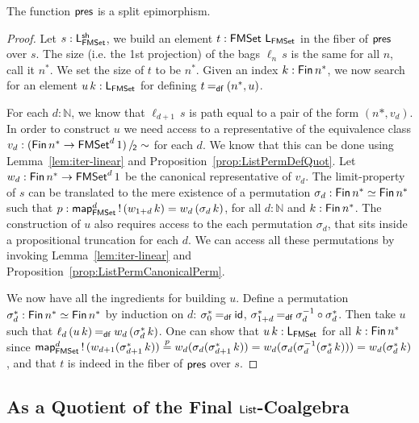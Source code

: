 \documentclass[runningheads]{llncs}
\begin{document}
\begin{theorem}\label{thm:InjPresSurjective}
 The function $\operatorname{\mathsf{pres}}$ is a split epimorphism.
\end{theorem}
\begin{proof}
  Let $s : \mathsf{L}^{\mathsf{sh}}_{\operatorname{\mathsf{FMSet}}}$, we build an element $t : \operatorname{\mathsf{FMSet}} \,\mathsf{L}_{\operatorname{\mathsf{FMSet}}}$ in the fiber of $\operatorname{\mathsf{pres}}$ over $s$. The size (i.e. the 1st projection) of the bags $\ell_n\,s$ is the same for all $n$, call it $n^*$. We set the size of $t$ to be $n^*$. Given an index $k : \operatorname{\mathsf{Fin}} n^*$, we now search for an element $u\,k : \mathsf{L}_{\operatorname{\mathsf{FMSet}}}$ for defining $t \mathbin{=_\mathsf{df}} (n^*,u)$.

  For each $d : ℕ$, we know that $\ell_{d + 1}\,s$ is path equal to a pair of the form $(n*,v_d)$. In order to construct $u$ we need access to a representative of the equivalence class $v_d : \SetQuot[(\Fin n^* \to \FMSet^d 1)][\sim]$ for each $d$. We know that this can be done using Lemma~\ref{lem:iter-linear} and Proposition~\ref{prop:ListPermDefQuot}. Let $w_d : \operatorname{\mathsf{Fin}} n^* \to \operatorname{\mathsf{FMSet}}^d 1$ be the canonical representative of $v_d$.
  The limit-property of $s$ can be translated to the mere existence of a permutation $\sigma_d : \operatorname{\mathsf{Fin}} n^* \simeq \operatorname{\mathsf{Fin}} n^*$
  such that $p : \operatorname{\mathsf{map}}_{\operatorname{\mathsf{FMSet}}}^d\operatorname{!}\,(w_{1 + d}\, k) = w_d \,(\sigma_d\,k)$, for all $d: ℕ$ and $k : \operatorname{\mathsf{Fin}} n^*$. The construction of $u$ also requires access to the each permutation $\sigma_d$, that sits inside a propositional truncation for each $d$. We can access all these permutations by invoking Lemma~\ref{lem:iter-linear} and Proposition~\ref{prop:ListPermCanonicalPerm}.

  We now have all the ingredients for building $u$. Define a permutation $\sigma^*_d : \operatorname{\mathsf{Fin}} n^* \simeq \operatorname{\mathsf{Fin}} n^*$ by induction on $d$: $\sigma^*_0 \mathbin{=_\mathsf{df}} \operatorname{\mathsf{id}}$, $\sigma^*_{1+d} \mathbin{=_\mathsf{df}} \sigma_d^{-1} \circ \sigma^*_d$. Then take $u$ such that $\ell_d \,(u\,k) \mathbin{=_\mathsf{df}} w_d\,(\sigma^*_d \,k)$. One can show that $u\,k : \mathsf{L}_{\operatorname{\mathsf{FMSet}}}$ for all $k : \operatorname{\mathsf{Fin}} n^*$ since
  $\operatorname{\mathsf{map}}_{\operatorname{\mathsf{FMSet}}}^d\operatorname{!}\, (w_{d+1}(\sigma^*_{d+1}\, k)) \stackrel{p}{=} w_d (\sigma_d (\sigma^*_{d+1}\, k)) = w_d (\sigma_d (\sigma_d^{-1} (\sigma^*_d\, k))) = w_d (\sigma^*_d\, k)$,
  and that $t$ is indeed in the fiber of $\operatorname{\mathsf{pres}}$ over $s$.
\end{proof}


\subsection{As a Quotient of the Final $\operatorname{\mathsf{List}}$-Coalgebra}\label{sec:final-quotient-set}
\end{document}
